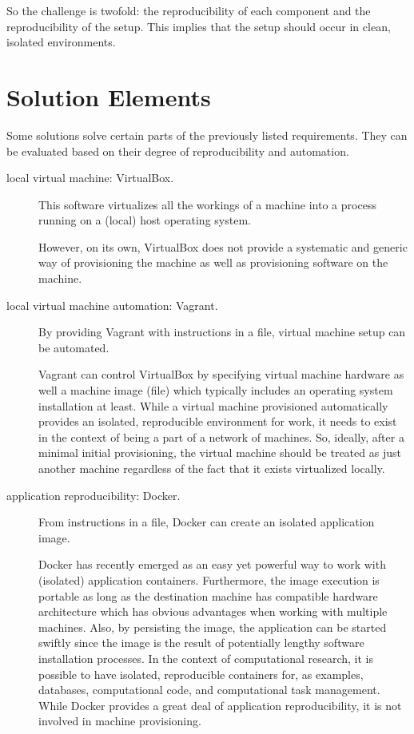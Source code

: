 So the challenge is twofold: the reproducibility of each component and the reproducibility of the setup.
%
This implies that the setup should occur in clean, isolated environments.


\section{Solution Elements}


Some solutions solve certain parts of the previously listed requirements.
%
They can be evaluated based on their degree of reproducibility and automation.


\begin{description}


\item[local virtual machine: \textsf{VirtualBox}.]
  This software virtualizes all the workings of a machine into a process running on a (local) host operating system.

  
  However, on its own, \textsf{VirtualBox} does not provide a systematic and generic way of provisioning the machine as well as provisioning software on the machine.


\item[local virtual machine automation: \textsf{Vagrant}.]
  By providing \textsf{Vagrant} with instructions in a file, virtual machine setup can be automated.
  

  \textsf{Vagrant} can control \textsf{VirtualBox} by specifying virtual machine hardware as well a machine image (file) which typically includes an operating system installation at least.
  While a virtual machine provisioned automatically provides an isolated, reproducible environment for work, it needs to exist in the context of being a part of a network of machines.
  So, ideally, after a minimal initial provisioning, the virtual machine should be treated as just another machine regardless of the fact that it exists virtualized locally.


\item[application reproducibility: \textsf{Docker}.]
  From instructions in a file, \textsf{Docker} can create an isolated application image.


  \textsf{Docker} has recently emerged as an easy yet powerful way to work with (isolated) application containers.
  Furthermore, the image execution is portable as long as the destination machine has compatible hardware architecture which has obvious advantages when working with multiple machines.
  Also, by persisting the image, the application can be started swiftly since the image is the result of potentially lengthy software installation processes.
%
  In the context of computational research, it is possible to have isolated, reproducible containers for, as examples, databases, computational code, and computational task management.
  While \textsf{Docker} provides a great deal of application reproducibility, it is not involved in machine provisioning.




\end{description}
